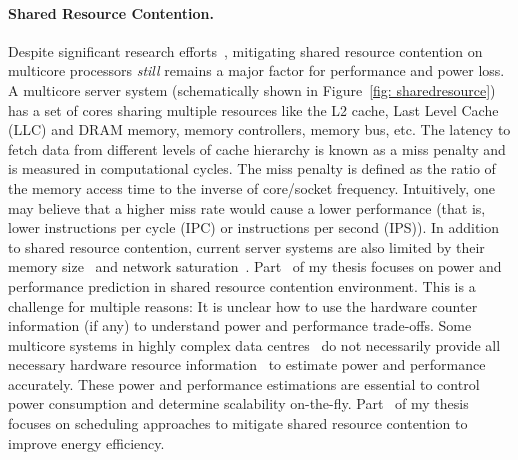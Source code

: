 \paragraph{Shared Resource Contention.} Despite significant research
efforts~\citep{Nishtala:2013:ETC:2555754.2555775,Zhuravlev:2013:SES:2498743.2498946,
    Blagodurov:2010:CSM:1880018.1880019, Petrucci:2012:LSE:2387869.2387876,
Petrucci:2015:ETA:2724585.2566618, Zivanovic:2016:LNE:2989081.2989083,
Asifuzzaman:2016:PIS:2989081.2989082}, mitigating shared resource contention on multicore
processors \emph{still} remains a major factor for performance and power loss.  A
multicore server system (schematically shown in Figure~\ref{fig: sharedresource}) has a
set of cores sharing multiple resources like the L2 cache, Last Level Cache (LLC) and DRAM
memory, memory controllers, memory bus, etc.  The latency to fetch data from different
levels of cache hierarchy is known as a miss penalty and is measured in computational
cycles.  The miss penalty is defined as the ratio of the memory access time to the inverse
of core/socket frequency.  Intuitively, one may believe that a higher miss rate would
cause a lower performance (that is, lower instructions per cycle (IPC) or instructions per
second (IPS)).  In addition to shared resource contention, current server systems are also
limited by their memory size~\citep{Zivanovic:2016:LNE:2989081.2989083} and network
saturation~\citep{Guo:2015:PLS:2785956.2787496}. Part~ of my thesis focuses on
power and performance prediction in shared resource contention environment.  This is a
challenge for multiple reasons: {\small{}} It is unclear how to use the hardware
counter information (if any) to understand power and performance trade-offs.
{\small{}} Some multicore systems in highly complex data
centres~\citep{Mars2013Whare-map} do not necessarily provide all necessary hardware
resource information~\citep{Su:2014:POP:2742155.2742200} to estimate power and performance
accurately. These power and performance estimations are essential to control power
consumption and determine scalability on-the-fly. Part~ of my thesis focuses on
scheduling approaches to mitigate shared resource contention to improve energy efficiency.

